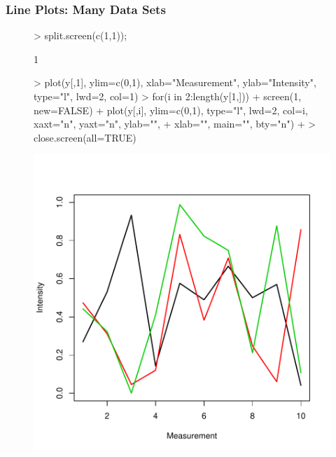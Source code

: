 \documentclass{beamer}
\newcommand{\Rfunction}[1]{{\texttt{#1}}}
\begin{document}
\begin{frame}[containsverbatim]  
	\frametitle{Line Plots: Many Data Sets}
\scriptsize
\tiny
\begin{figure}
  \centering
\begin{Schunk}
\begin{Sinput}
> split.screen(c(1,1)); 
\end{Sinput}
\begin{Soutput}
[1] 1
\end{Soutput}
\begin{Sinput}
> plot(y[,1], ylim=c(0,1), xlab="Measurement", ylab="Intensity", type="l", lwd=2, col=1)
> for(i in 2:length(y[1,])) { 
+ 	screen(1, new=FALSE)
+ 	plot(y[,i], ylim=c(0,1), type="l", lwd=2, col=i, xaxt="n", yaxt="n", ylab="", 
+              xlab="", main="", bty="n") 
+ }
> close.screen(all=TRUE) 
\end{Sinput}
\end{Schunk}
\includegraphics{fig--013}
\label{fig:line_plot_many}
\end{figure}
\end{frame}
\end{document}

